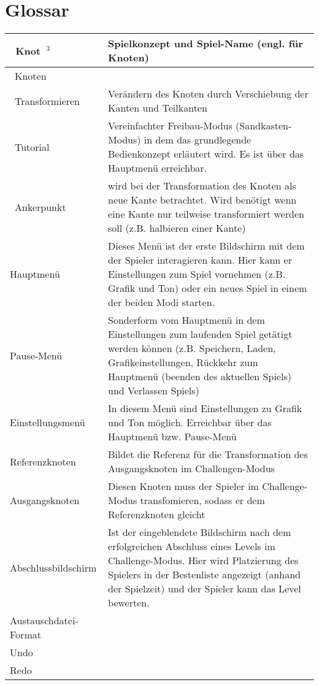 \chapter{Glossar}

\begin{tabular}{|p{}|p{}|}
\hline 
\ Knot~$^3$ & Spielkonzept und Spiel-Name (engl. für Knoten)\\
\hline
\ Knoten & %
\\
\hline
\ Transformieren & Verändern des Knoten durch Verschiebung der Kanten und Teilkanten\\
\hline 
\ Tutorial & Vereinfachter Freibau-Modus (Sandkasten-Modus)  in dem das grundlegende Bedienkonzept erläutert wird. Es ist über das Hauptmenü erreichbar.\\
\hline 
\ Ankerpunkt & wird bei der Transformation des Knoten als neue Kante betrachtet. Wird benötigt wenn eine Kante nur teilweise transformiert werden soll (z.B. halbieren einer Kante)\\ 
\hline 
Hauptmenü & Dieses Menü ist der erste Bildschirm mit dem der Spieler interagieren kann. Hier kann er Einstellungen zum Spiel vornehmen (z.B. Grafik und Ton) oder ein neues Spiel in einem der beiden Modi starten. \\ 
\hline 
Pause-Menü & Sonderform vom Hauptmenü in dem Einstellungen zum laufenden Spiel getätigt werden können (z.B. Speichern, Laden, Grafikeinstellungen, Rückkehr zum Hauptmenü (beenden des aktuellen Spiels) und Verlassen Spiels) \\ 
\hline 
Einstellungsmenü & In diesem Menü sind Einstellungen zu Grafik und Ton möglich. Erreichbar über das Hauptmenü bzw. Pause-Menü \\ 
\hline 
Referenzknoten & Bildet die Referenz für die Transformation des Ausgangsknoten im Challengen-Modus\\ 
\hline 
Ausgangsknoten & Diesen Knoten muss der Spieler im Challenge-Modus transfomieren, sodass er dem Referenzknoten gleicht \\ 
\hline 
Abschlussbildschirm & Ist der eingeblendete Bildschirm nach dem erfolgreichen Abschluss eines Levels im Challenge-Modus. Hier wird Platzierung des Spielers in der Bestenliste angezeigt (anhand der Spielzeit) und der Spieler kann das Level bewerten.\\ 
\hline 
Austauschdatei-Format & %
\\
\hline
Undo & %
\\
\hline
Redo & %
\\

\end{tabular}
